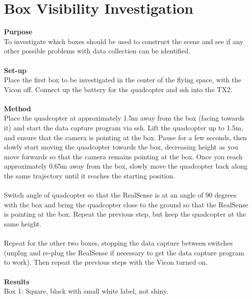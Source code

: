 \documentclass[12pt,a4paper]{article}
\begin{document}
\section{Box Visibility Investigation}
\textbf{Purpose} \\
To investigate which boxes should be used to construct the scene and see if any other possible problems with data collection can be identified.
\\\\
\textbf{Set-up} \\
Place the first box to be investigated in the center of the flying space, with the Vicon off. Connect up the battery for the quadcopter and ssh into the TX2. 
\\\\
\textbf{Method} \\
Place the quadcopter at approximately 1.5m away from the box (facing towards it) and start the data capture program via ssh. Lift the quadcopter up to 1.5m, and ensure that the camera is pointing at the box. Pause for a few seconds, then slowly start moving the quadcopter towards the box, decreasing height as you move forwards so that the camera remains pointing at the box. Once you reach approximately 0.65m away from the box, slowly move the quadcopter back along the same trajectory until it reaches the starting position.
\\\\
Switch angle of quadcopter so that the RealSense is at an angle of 90 degrees with the box and bring the quadcopter close to the ground so that the RealSense is pointing at the box. Repeat the previous step, but keep the quadcopter at the same height.
\\\\
Repeat for the other two boxes, stopping the data capture between switches (unplug and re-plug the RealSense if necessary to get the data capture program to work). Then repeat the previous steps with the Vicon turned on.
\\\\
\textbf{Results} \\
Box 1: Square, black with small white label, not shiny. \\
\end{document}
